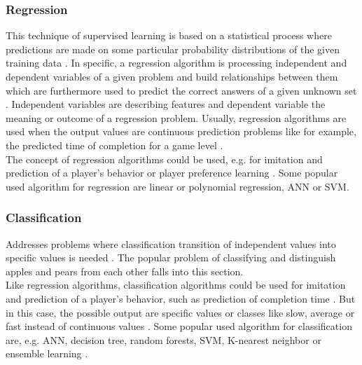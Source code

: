 \documentclass[MGS,Master,english]{twbook}%
\begin{document}
\subsubsection{Regression}
This technique of supervised learning is based on a statistical process where predictions are made on some particular probability distributions of the given training data \cite{ml::book::developer}. In specific, a regression algorithm is processing independent and dependent variables of a given problem and build relationships between them which are furthermore used to predict the correct answers of a given unknown set \cite{ml::book::developer}. Independent variables are describing features and dependent variable the meaning or outcome of a regression problem. Usually, regression algorithms are used when the output values are continuous prediction problems like for example, the predicted time of completion for a game level \cite{ai::book}.\\
The concept of regression algorithms could be used, e.g. for imitation and prediction of a player's behavior or player preference learning \cite{ai::book}. Some popular used algorithm for regression are linear or polynomial regression, \ac{ANN} or \ac{SVM}. \cite{ai::book}

\subsubsection{Classification}
Addresses problems where classification transition of independent values into specific values is needed \cite{ai::book}. The popular problem of classifying and distinguish apples and pears from each other falls into this section.\\
Like regression algorithms, classification algorithms could be used for imitation and prediction of a player's behavior, such as prediction of completion time \cite{ai::book}. But in this case, the possible output are specific values or classes like slow, average or fast instead of continuous values \cite{ai::book}. Some popular used algorithm for classification are, e.g. \ac{ANN}, decision tree, random forests, \ac{SVM}, K-nearest neighbor or ensemble learning \cite{ai::book}.
\end{document}

